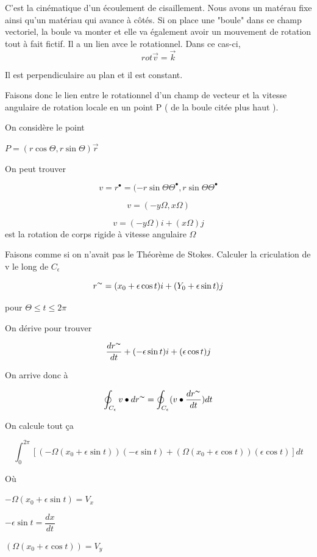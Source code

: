 C'est la cinématique d'un écoulement de cisaillement. Nous avons un matérau fixe ainsi qu'un matériau qui avance à côtés.
Si on place une "boule" dans ce champ vectoriel, la boule va monter et elle va également avoir un mouvement de rotation tout à fait fictif. Il a un lien avce le rotationnel. Dans ce cas-ci,\[rot \vec v = \vec k\]

Il est perpendiculaire au plan et il est constant.

Faisons donc le lien entre le rotationnel d'un champ de vecteur et la vitesse angulaire de rotation locale en un point P ( de la boule citée plus haut ).

On considère le point


$P = ( r \cos \Theta, r \sin \Theta ) \vec r $

On peut trouver

\[ v = r^{\bullet} = (-r\sin \Theta \Theta^{\bullet}, r\sin \Theta \Theta^{\bullet}\]

\[v = (-y \Omega , x \Omega) \]

\[v=(-y\Omega) i + (x\Omega) j \] est la rotation de corps rigide à vitesse angulaire $\Omega$

Faisons comme si on n'avait pas le Théorème de Stokes. Calculer la criculation de v le long de $C_{\epsilon}$

$$r^{\thicksim} = (x_0+ \epsilon \cos t ) i +( Y_0 + \epsilon \sin t )j $$

pour $\Theta \le t \le 2 \pi $

On dérive pour trouver

\[\frac{d r^{\thicksim} }{dt} + ( -\epsilon \sin t ) i + ( \epsilon \cos t ) j\]

On arrive donc à

\[\oint_{C_{\epsilon}} v \bullet dr^{\thicksim} = \oint_{C_{\epsilon}} ( v \bullet \frac{dr^{\thicksim}}{dt} ) dt \]


On calcule tout ça

\[\int_0^{2\pi} \left[ (-\Omega ( x_0 + \epsilon \sin t )) ( - \epsilon \sin t ) + (\Omega ( x_0 + \epsilon \cos t))( \epsilon \cos t ) \right] dt \]

Où

$-\Omega ( x_0 + \epsilon \sin t ) = V_x$



$- \epsilon \sin t  = \dfrac{dx}{dt}$



$(\Omega ( x_0 + \epsilon \cos t)) = V_y$




